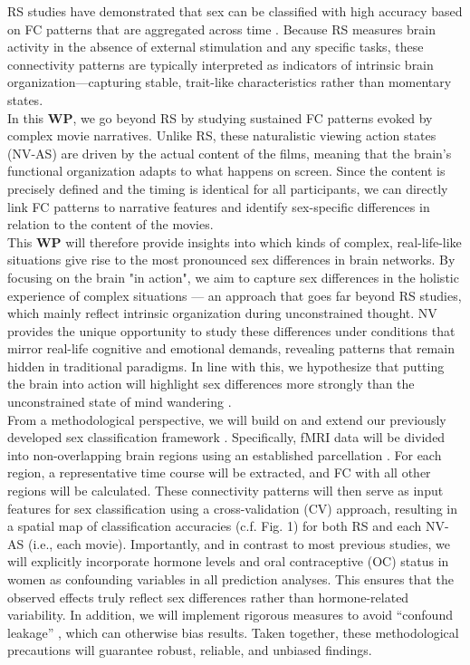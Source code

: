 \documentclass[11pt,a4paper]{article}
\begin{document}
RS studies have demonstrated that sex can be classified with high accuracy based on FC patterns that are 
aggregated across time \parencite{casanovaCombiningGraphMachine2012a,ritchieSexDifferencesAdult2018,weisSexClassificationResting2020a,wierschAccurateSexPrediction2023a,wierschSexDifferencesBrain2021a}. 
Because RS measures brain activity in the absence of external stimulation and any specific tasks, these connectivity patterns are 
typically interpreted as indicators of intrinsic brain organization—capturing stable, trait-like characteristics 
rather than momentary states.\\
In this \textbf{WP}, we go beyond RS by studying sustained FC patterns evoked by complex movie narratives. 
Unlike RS, these naturalistic viewing action states (NV-AS) are driven by the actual content of the films, 
meaning that the brain's functional organization adapts to what happens on screen. Since the content is precisely 
defined and the timing is identical for all participants, we can directly link FC patterns to narrative features and identify
sex-specific differences in relation to the content of the movies.\\
This \textbf{WP} will therefore provide insights into which kinds of complex, 
real-life-like situations give rise to the most pronounced sex differences in brain networks. 
By focusing on the brain "in action", we aim to capture sex differences in the holistic experience of complex situations — an 
approach that goes far beyond RS studies, which mainly reflect intrinsic organization during unconstrained thought. 
NV provides the unique opportunity to study these differences under conditions that mirror real-life cognitive 
and emotional demands, revealing patterns that remain hidden in traditional paradigms.
In line with this, we hypothesize that putting the brain into action will highlight sex differences more strongly 
than the unconstrained state of mind wandering \parencite{vanderwalIndividualDifferencesFunctional2017}.\\
From a methodological perspective, we will build on and extend our previously developed sex classification 
framework \parencite{weisSexClassificationResting2020a}. Specifically, fMRI data will be divided 
into non-overlapping brain regions using an established parcellation \parencite{schaeferLocalGlobalParcellationHuman2018}. 
For each region, a representative time course will be extracted, and FC with all other regions will be calculated. 
These connectivity patterns will then serve as input features for sex classification using a cross-validation (CV) approach, 
resulting in a spatial map of classification accuracies (c.f. Fig. 1) for both RS and each NV-AS (i.e., each movie).
Importantly, and in contrast to most previous studies, we will explicitly incorporate hormone levels and oral contraceptive (OC) 
status in women as confounding variables in all prediction analyses. This ensures that the observed effects truly reflect 
sex differences rather than hormone-related variability. In addition, we will implement rigorous measures to avoid 
“confound leakage” \parencite{hamdanConfoundleakageConfoundRemoval2022a}, which can otherwise bias results. 
Taken together, these methodological precautions will guarantee robust, reliable, and unbiased findings.
\end{document}
